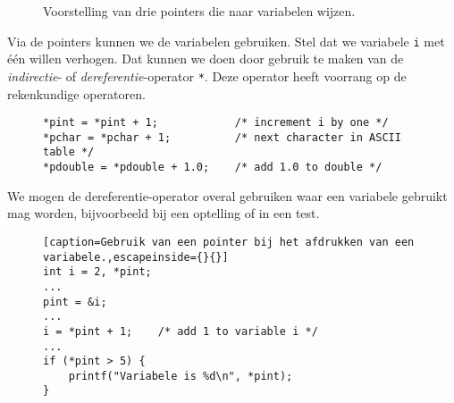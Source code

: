 \begin{figure}[!ht]
\centering
{}
\caption{Voorstelling van drie pointers die naar variabelen wijzen.}
\label{fig:poivoorstelling2}
\end{figure}

Via de pointers kunnen we de variabelen gebruiken. Stel dat we variabele \texttt{i} met één willen verhogen. Dat kunnen we doen door gebruik te maken van de \textsl{indirectie}- of \textsl{dereferentie}-operator \texttt{*}. Deze operator heeft voorrang op de rekenkundige operatoren.

\begin{figure}[!ht]
\begin{lstlisting}[caption=Gebruik van pointers bij toekenningen.]
*pint = *pint + 1;            /* increment i by one */
*pchar = *pchar + 1;          /* next character in ASCII table */
*pdouble = *pdouble + 1.0;    /* add 1.0 to double */
\end{lstlisting}
\end{figure}

We mogen de dereferentie-operator overal gebruiken waar een variabele gebruikt mag worden, bijvoorbeeld bij een optelling of in een test.

\begin{figure}[!ht]
\begin{lstlisting}[caption=Gebruik van een pointer bij het afdrukken van een variabele.,escapeinside={}{}]
int i = 2, *pint;
...
pint = &i;
...
i = *pint + 1;    /* add 1 to variable i */
...
if (*pint > 5) {
    printf("Variabele is %d\n", *pint);
}
\end{lstlisting}
\end{figure}

